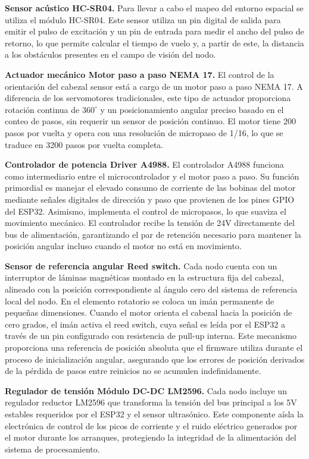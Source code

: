 \textbf{Sensor acústico HC-SR04.} Para llevar a cabo el mapeo del entorno espacial se utiliza el módulo HC-SR04. Este sensor utiliza un pin digital de salida para emitir el pulso de excitación y un pin de entrada para medir el ancho del pulso de retorno, lo que permite calcular el tiempo de vuelo y, a partir de este, la distancia a los obstáculos presentes en el campo de visión del nodo.

\textbf{Actuador mecánico Motor paso a paso NEMA 17.} El control de la orientación del cabezal sensor está a cargo de un motor paso a paso NEMA 17. A diferencia de los servomotores tradicionales, este tipo de actuador proporciona rotación continua de $360^{\circ}$ y un posicionamiento angular preciso basado en el conteo de pasos, sin requerir un sensor de posición continuo. El motor tiene 200 pasos por vuelta y opera con una resolución de micropaso de 1/16, lo que se traduce en 3200 pasos por vuelta completa.

\textbf{Controlador de potencia Driver A4988.} El controlador A4988 funciona como intermediario entre el microcontrolador y el motor paso a paso. Su función primordial es manejar el elevado consumo de corriente de las bobinas del motor mediante señales digitales de dirección y paso que provienen de los pines GPIO del ESP32. Asimismo, implementa el control de micropasos, lo que suaviza el movimiento mecánico. El controlador recibe la tensión de 24V directamente del bus de alimentación, garantizando el par de retención necesario para mantener la posición angular incluso cuando el motor no está en movimiento.

\textbf{Sensor de referencia angular Reed switch.} Cada nodo cuenta con un interruptor de láminas magnéticas montado en la estructura fija del cabezal, alineado con la posición correspondiente al ángulo cero del sistema de referencia local del nodo. En el elemento rotatorio se coloca un imán permanente de pequeñas dimensiones. Cuando el motor orienta el cabezal hacia la posición de cero grados, el imán activa el reed switch, cuya señal es leída por el ESP32 a través de un pin configurado con resistencia de pull-up interna. Este mecanismo proporciona una referencia de posición absoluta que el firmware utiliza durante el proceso de inicialización angular, asegurando que los errores de posición derivados de la pérdida de pasos entre reinicios no se acumulen indefinidamente.

\textbf{Regulador de tensión Módulo DC-DC LM2596.} Cada nodo incluye un regulador reductor LM2596 que transforma la tensión del bus principal a los 5V estables requeridos por el ESP32 y el sensor ultrasónico. Este componente aísla la electrónica de control de los picos de corriente y el ruido eléctrico generados por el motor durante los arranques, protegiendo la integridad de la alimentación del sistema de procesamiento.

